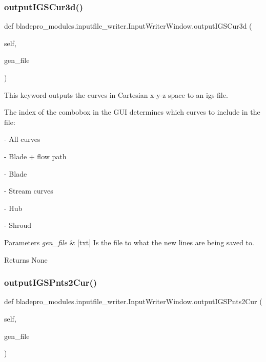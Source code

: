 \subsubsection{\texorpdfstring{output\+I\+G\+S\+Cur3d()}{outputIGSCur3d()}}
{\footnotesize\ttfamily def bladepro\+\_\+modules.\+inputfile\+\_\+writer.\+Input\+Writer\+Window.\+output\+I\+G\+S\+Cur3d (\begin{DoxyParamCaption}\item[{}]{self,  }\item[{}]{gen\+\_\+file }\end{DoxyParamCaption})}



This keyword outputs the curves in Cartesian x-\/y-\/z space to an igs-\/file. 

The index of the combobox in the G\+UI determines which curves to include in the file\+:

\begin{DoxyItemize}
\item {} -\/ All curves \item {} -\/ Blade + flow path \item {} -\/ Blade \item {} -\/ Stream curves \item {} -\/ Hub \item {} -\/ Shroud\end{DoxyItemize}

\begin{DoxyParams}{Parameters}
{\em gen\+\_\+file} & \mbox{[}txt\mbox{]} Is the file to what the new lines are being saved to. \\
\hline
\end{DoxyParams}
\begin{DoxyReturn}{Returns}
None 
\end{DoxyReturn}
\hypertarget{a00071_a60dc6e0ccec5f096ee68f997079abef3}{}\label{a00071_a60dc6e0ccec5f096ee68f997079abef3} 
\subsubsection{\texorpdfstring{output\+I\+G\+S\+Pnts2\+Cur()}{outputIGSPnts2Cur()}}
{\footnotesize\ttfamily def bladepro\+\_\+modules.\+inputfile\+\_\+writer.\+Input\+Writer\+Window.\+output\+I\+G\+S\+Pnts2\+Cur (\begin{DoxyParamCaption}\item[{}]{self,  }\item[{}]{gen\+\_\+file }\end{DoxyParamCaption})}



